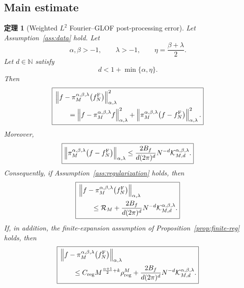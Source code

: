 \documentclass[UTF8]{ctexart}
\newtheorem{theorem}{定理}
\begin{document}
\subsection{Main estimate}

\begin{theorem}[Weighted $L^2$ Fourier--GLOF post-processing error]
\label{thm:main-L2}
Let Assumption~\ref{ass:data} hold. Let
\[
    \alpha,\beta>-1,
    \qquad
    \lambda>-1,
    \qquad
    \eta=\frac{\beta+\lambda}{2}.
\]
Let $d\in\mathbb N$ satisfy
\[
    d<1+\min\{\alpha,\eta\}.
\]
Then
\[
\boxed{
\begin{aligned}
    &
    \left\|
    f-\pi_M^{\alpha,\beta,\lambda}
    \bigl(f_N^{\rm F}\bigr)
    \right\|_{\alpha,\lambda}^2
    \\
    &\qquad
    =
    \left\|
    f-\pi_M^{\alpha,\beta,\lambda}f
    \right\|_{\alpha,\lambda}^2
    +
    \left\|
    \pi_M^{\alpha,\beta,\lambda}
    \bigl(f-f_N^{\rm F}\bigr)
    \right\|_{\alpha,\lambda}^2 .
\end{aligned}
}
\]
Moreover,
\[
\boxed{
    \left\|
    \pi_M^{\alpha,\beta,\lambda}
    \bigl(f-f_N^{\rm F}\bigr)
    \right\|_{\alpha,\lambda}
    \le
    \frac{
    2B_f
    }{
    d(2\pi)^d
    }
    N^{-d}
    \mathcal K_{M,d}^{\alpha,\beta,\lambda}.
}
\]
Consequently, if Assumption~\ref{ass:regularization} holds, then
\[
\boxed{
\begin{aligned}
    &
    \left\|
    f-\pi_M^{\alpha,\beta,\lambda}
    \bigl(f_N^{\rm F}\bigr)
    \right\|_{\alpha,\lambda}
    \\
    &\qquad
    \le
    \mathcal R_M
    +
    \frac{
    2B_f
    }{
    d(2\pi)^d
    }
    N^{-d}
    \mathcal K_{M,d}^{\alpha,\beta,\lambda}.
\end{aligned}
}
\]
If, in addition, the finite-expansion assumption of
Proposition~\ref{prop:finite-reg} holds, then
\[
\boxed{
\begin{aligned}
    &
    \left\|
    f-\pi_M^{\alpha,\beta,\lambda}
    \bigl(f_N^{\rm F}\bigr)
    \right\|_{\alpha,\lambda}
    \\
    &\qquad
    \le
    C_{\rm reg}
    M^{\frac{\alpha+1}{2}+k}
    \rho_{\rm reg}^M
    +
    \frac{
    2B_f
    }{
    d(2\pi)^d
    }
    N^{-d}
    \mathcal K_{M,d}^{\alpha,\beta,\lambda}.
\end{aligned}
}
\]
\end{theorem}
\end{document}
